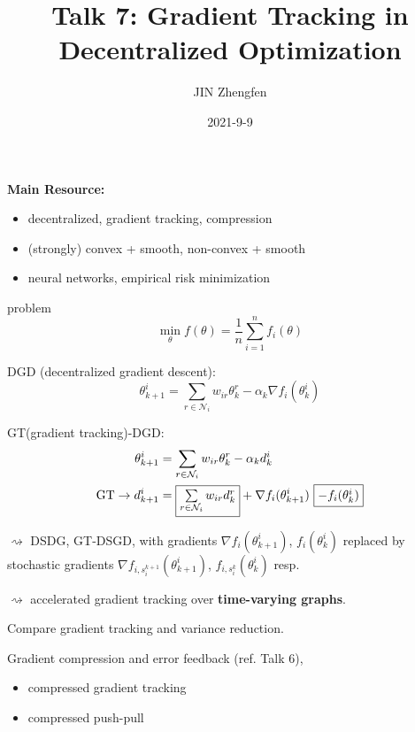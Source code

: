 


\title{Talk 7: Gradient Tracking in Decentralized Optimization}
\date{2021-9-9}
\author{JIN Zhengfen}

\maketitle

{\bfseries Main Resource: \cite{li2021accelerated, song2021compressed, liao2021compressed, zhang2019decentralized, xin2020gradient, sun2020improving}}

\vspace{2em}

\begin{itemize}
    \item decentralized, gradient tracking, compression
    \item (strongly) convex + smooth, non-convex + smooth
    \item neural networks, empirical risk minimization
\end{itemize}

\vspace{2em}


problem
$$\min_{\theta} f(\theta) = \dfrac{1}{n}\sum\limits_{i=1}^n f_i(\theta)$$

DGD (decentralized gradient descent):
$$\theta^i_{k+1} = \sum\limits_{r\in\mathcal{N}_i} w_{ir} \theta^r_k - \alpha_k \nabla f_i(\theta^i_k)$$

GT(gradient tracking)-DGD:
\begin{align*}
    \theta^i_{k+1} & = \sum\limits_{r\in\mathcal{N}_i} w_{ir} \theta^r_k - \alpha_k d_k^i \\
    \text{GT} \to d_{k+1}^i & = \framebox{$\sum\limits_{r\in\mathcal{N}_i} w_{ir}d_k^r$} + \nabla f_i(\theta^i_{k+1}) \ \framebox{$- f_i(\theta^i_k)$}
\end{align*}

$\rightsquigarrow$ DSDG, GT-DSGD, with gradients $\nabla f_i(\theta^i_{k+1})$, $f_i(\theta^i_k)$ replaced by stochastic gradients $\nabla f_{i,s_i^{k+1}}(\theta^i_{k+1})$, $f_{i,s_i^k}(\theta^i_k)$ resp.

$\rightsquigarrow$ accelerated gradient tracking over {\bf time-varying graphs}.

\begin{question}[TODO]
Compare gradient tracking and variance reduction.
\end{question}

Gradient compression and error feedback (ref. Talk 6),
\begin{itemize}
    \item compressed gradient tracking \cite{liao2021compressed}
    \item compressed push-pull \cite{song2021compressed}
\end{itemize}





